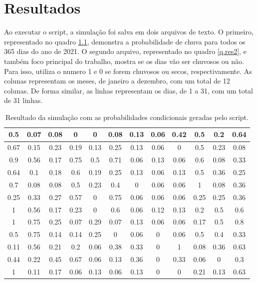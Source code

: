 \chapter{Resultados}
\label{c.resultados}
Ao executar o script, a simulação foi salva em dois arquivos de texto. O primeiro, representado no quadro \ref{q.res1}, demonstra a probabilidade de chuva para todos os 365 dias do ano de 2021. O segundo arquivo, representado no quadro \ref{q.res2}, e também foco principal do trabalho, mostra se os dias vão ser chuvosos ou não. Para isso, utiliza o numero 1 e 0 se forem chuvosos ou secos, respectivamente. As colunas representam os meses, de janeiro a dezembro, com um total de 12 colunas. De forma similar, as linhas representam os dias, de 1 a 31, com um total de 31 linhas.

\begin{table}[H]
\caption{Resultado da simulação com as probabilidades condicionais geradas pelo script.}
\label{q.res1}
\centering
\begin{tabular}{|c|c|c|c|c|c|c|c|c|c|c|c|}
\hline
0.5  & 0.07 & 0.08 & 0    & 0    & 0.08 & 0.13 & 0.06 & 0.42 & 0.5  & 0.2  & 0.64 \\ \hline
0.67 & 0.15 & 0.23 & 0.19 & 0.13 & 0.25 & 0.13 & 0.06 & 0    & 0.5  & 0.23 & 0.08 \\ \hline
0.9  & 0.56 & 0.17 & 0.75 & 0.5  & 0.71 & 0.06 & 0.13 & 0.06 & 0.6  & 0.08 & 0.33 \\ \hline
0.64 & 0.1  & 0.18 & 0.6  & 0.19 & 0.25 & 0.13 & 0.06 & 0.13 & 0.5  & 0.36 & 0.25 \\ \hline
0.7  & 0.08 & 0.08 & 0.5  & 0.23 & 0.4  & 0    & 0.06 & 0.06 & 1    & 0.08 & 0.36 \\ \hline
0.25 & 0.33 & 0.27 & 0.57 & 0    & 0.75 & 0.06 & 0.06 & 0.06 & 0.25 & 0.25 & 0.36 \\ \hline
1    & 0.56 & 0.17 & 0.23 & 0    & 0.6  & 0.06 & 0.12 & 0.13 & 0.2  & 0.5  & 0.6  \\ \hline
1    & 0.75 & 0.25 & 0.07 & 0.29 & 0.07 & 0.13 & 0.06 & 0.06 & 0.17 & 0.5  & 0.8  \\ \hline
0.5  & 0.75 & 0.14 & 0.14 & 0.25 & 0    & 0.06 & 0    & 0.06 & 0.5  & 0.4  & 0.33 \\ \hline
0.11 & 0.56 & 0.21 & 0.2  & 0.06 & 0.38 & 0.33 & 0    & 1    & 0.08 & 0.36 & 0.63 \\ \hline
0.44 & 0.22 & 0.45 & 0.67 & 0.06 & 0.13 & 0.36 & 0    & 0.33 & 0.06 & 0    & 0.3  \\ \hline
1    & 0.11 & 0.17 & 0.06 & 0.13 & 0.06 & 0.13 & 0    & 0    & 0.21 & 0.13 & 0.63 \\ \hline

\end{tabular}
\end{table}
